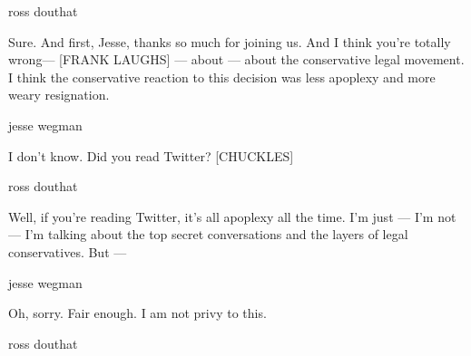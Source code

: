 ross douthat

Sure. And first, Jesse, thanks so much for joining us. And I think
you're totally wrong--- {[}FRANK LAUGHS{]} --- about --- about the
conservative legal movement. I think the conservative reaction to this
decision was less apoplexy and more weary resignation.

jesse wegman

I don't know. Did you read Twitter? {[}CHUCKLES{]}

ross douthat

Well, if you're reading Twitter, it's all apoplexy all the time. I'm
just --- I'm not --- I'm talking about the top secret conversations and
the layers of legal conservatives. But ---

jesse wegman

Oh, sorry. Fair enough. I am not privy to this.

ross douthat


